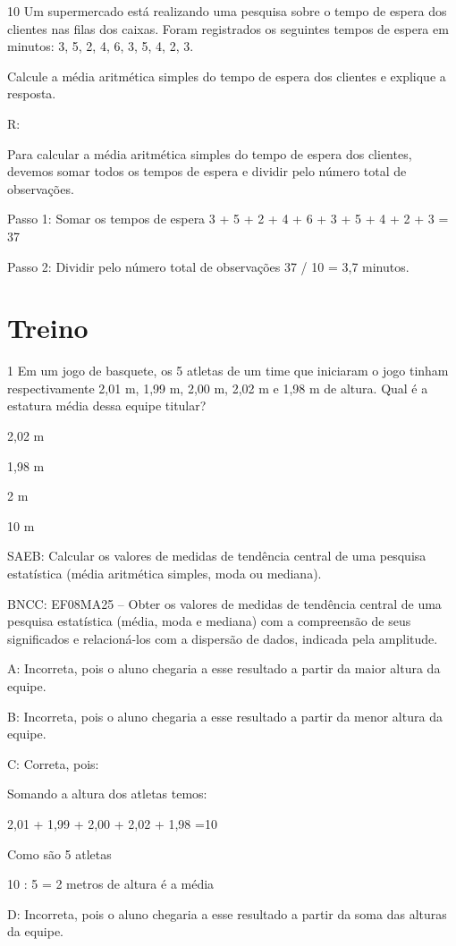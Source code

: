 {\num{10} Um supermercado está realizando uma pesquisa sobre o tempo de espera
dos clientes nas filas dos caixas. Foram registrados os seguintes tempos
de espera em minutos: 3, 5, 2, 4, 6, 3, 5, 4, 2, 3.

Calcule a média aritmética simples do tempo de espera dos clientes e
explique a resposta.

R:

Para calcular a média aritmética simples do tempo de espera dos
clientes, devemos somar todos os tempos de espera e dividir pelo número
total de observações.

Passo 1: Somar os tempos de espera 3 + 5 + 2 + 4 + 6 + 3 + 5 + 4 + 2 + 3
= 37

Passo 2: Dividir pelo número total de observações 37 / 10 = 3,7 minutos.

\section{Treino}

\num{1} Em um jogo de basquete, os 5 atletas de um time que iniciaram o jogo
tinham respectivamente 2,01 m, 1,99 m, 2,00 m, 2,02 m e 1,98 m de
altura. Qual é a estatura média dessa equipe titular?
\item 2,02 m
\item 1,98 m
\item 2 m
\item 10 m

SAEB: Calcular os valores de medidas de tendência central de uma
pesquisa estatística (média aritmética simples, moda ou mediana).

BNCC: EF08MA25 -- Obter os valores de medidas de tendência central de
uma pesquisa estatística (média, moda e mediana) com a compreensão de
seus significados e relacioná-los com a dispersão de dados, indicada
pela amplitude.

A: Incorreta, pois o aluno chegaria a esse resultado a partir da maior
altura da equipe.

B: Incorreta, pois o aluno chegaria a esse resultado a partir da menor
altura da equipe.

C: Correta, pois:

Somando a altura dos atletas temos:

2,01 + 1,99 + 2,00 + 2,02 + 1,98 =10

Como são 5 atletas

10 : 5 = 2 metros de altura é a média

D: Incorreta, pois o aluno chegaria a esse resultado a partir da soma
das alturas da equipe.

}
